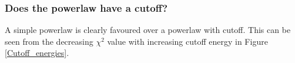 \documentclass[a4paper]{article}
\begin{document}
\subsubsection{Does the powerlaw have a cutoff?}
A simple powerlaw is clearly favoured over a powerlaw with cutoff. This can be seen from the decreasing $\chi^2$ value with increasing cutoff energy in Figure \ref{Cutoff_energies}. 
\begin{figure}[H]
\end{figure}
\end{document}
